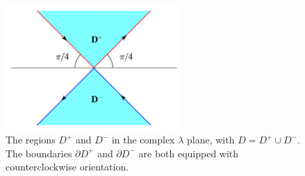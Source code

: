 \documentclass[12pt]{article}
\numberwithin{equation}{section}
\begin{document}
\begin{figure}[h]
    \centering \hspace{5mm}
    \includegraphics[width=0.60\textwidth]{D^+.pic.jpg}
    \caption{The regions $D^+$ and $D^-$ in the complex $\lambda$ plane, with $D=D^+\cup D^-$. The boundaries $\partial D^+$ and $\partial D^-$ are both equipped with counterclockwise orientation.}
    \label{2}
\end{figure}
\end{document}
